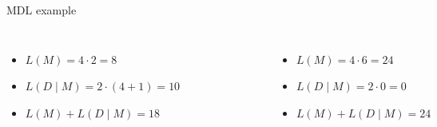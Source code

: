 \documentclass[10pt]{beamer}
\begin{document}
\begin{frame}{MDL example}
    \begin{columns}[T, onlytextwidth]

        \begin{itemize}
            \item $L(M) = 4 \cdot 2 = 8$
            \item $L(D \mid M) = 2 \cdot (4 + 1) = 10$
            \item $L(M) + L(D \mid M) = 18$
        \end{itemize}

        \begin{figure}
            \centering
            \includegraphics[scale=0.5]{figures/running-example/ILP/running-ex-ilp1.pdf}
        \end{figure}



        \begin{itemize}
            \item $L(M) = 4 \cdot 6 = 24$
            \item $L(D \mid M) = 2 \cdot 0 = 0$
            \item $L(M) + L(D \mid M) = 24$
        \end{itemize}


\end{columns}
\end{frame}
\end{document}
